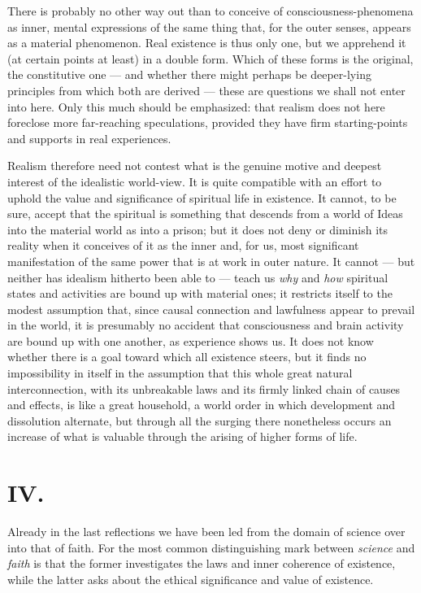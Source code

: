 \documentclass[12pt,a4paper,openany]{book}
\newcommand{\opage}[1]{\marginnote{\footnotesize\textit{[#1]}}}
\begin{document}
There is probably no other way out than to conceive of consciousness-phenomena as inner, mental expressions of the same thing that, for the outer senses, appears as a material phenomenon. Real existence is thus only one, but we apprehend it (at certain points at least) in a double form. Which of these forms is the original, the constitutive one --- and whether there might perhaps be deeper-lying principles from which both are derived --- these are questions we shall not enter into here. Only this much should be emphasized: that realism does not here foreclose more far-reaching speculations, provided they have firm starting-points and supports in real experiences.

Realism therefore need not contest what is the genuine motive and deepest interest of the idealistic world-view. It is quite compatible with an effort to uphold the value and significance of spiritual life in existence. It cannot, to be sure, accept that the spiritual is something that descends from a world of Ideas into the material world as into a prison; but it does not deny or diminish its reality when it conceives of it as the inner and, for us, most significant manifestation of the same power that is at work in outer nature. It cannot --- but neither has idealism hitherto been able to --- teach us \emph{why} and \emph{how} spiritual states and activities are bound up with material ones; it restricts itself to the modest assumption that, since causal connection and lawfulness appear to prevail in the world, it is presumably no accident that consciousness and brain activity are bound up with one another, as experience shows us.
\opage{10}It does not know whether there is a goal toward which all existence steers, but it finds no impossibility in itself in the assumption that this whole great natural interconnection, with its unbreakable laws and its firmly linked chain of causes and effects, is like a great household, a world order in which development and dissolution alternate, but through all the surging there nonetheless occurs an increase of what is valuable through the arising of higher forms of life.

\section*{IV.}

Already in the last reflections we have been led from the domain of science over into that of faith. For the most common distinguishing mark between \emph{science} and \emph{faith} is that the former investigates the laws and inner coherence of existence, while the latter asks about the ethical significance and value of existence.
\end{document}
